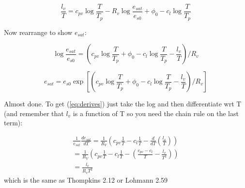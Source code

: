 \documentclass[12pt]{article}
\begin{document}
\begin{equation}
  \label{eq:2ndlaw}
\frac{l_v }{T}  = c_{pv} \log \frac{T }{T_p} - R_v \log \frac{ e_{sat} }{e_{s0}} + \phi_0 - c_l \log \frac{T }{T_p} 
\end{equation}

Now rearrange to show $e_{sat}$:

\begin{equation}
\label{eq:esatlog}
\log \frac{ e_{sat} }{e_{s0}} = \left (  c_{pv} \log \frac{T }{T_p}  + \phi_0 - c_l \log \frac{T }{T_p} - \frac{l_v }{T}  \right )/R_v 
\end{equation}

\begin{equation}
\label{eq:esatfull}
e_{sat}  = e_{s0} \exp \left [ \left (  c_{pv} \log \frac{T }{T_p}  + \phi_0 - c_l \log \frac{T }{T_p} - \frac{l_v }{T}  \right )/R_v \right ]
\end{equation}

Almost done.  To get (\ref{eq:derives}) just take the log and then
differentiate wrt T (and remember that $l_v$ is a function of T
so you need the chain rule on the last term):

\begin{gather*}
\frac{1 }{e_{sat}} \frac{d e_{sat} }{dT} =  \frac{1 }{R_V} \left (   c_{pv}  \frac{1 }{T}  - c_l  \frac{1 }{T} - \frac{ d}{dT} 
\left (\frac{l_v }{T} \right )  \right ) \\
 = \frac{1 }{R_V} \left (   c_{pv}  \frac{1 }{T}  - c_l  \frac{1 }{T} - 
\left (\frac{c_{pv} - c_l }{T} - \frac{l_v }{T^2}  \right )  \right ) \\
= \frac{ l_v}{R_v T^2} 
\end{gather*}
which is the same as Thompkins 2.12 or Lohmann 2.59
\end{document}
